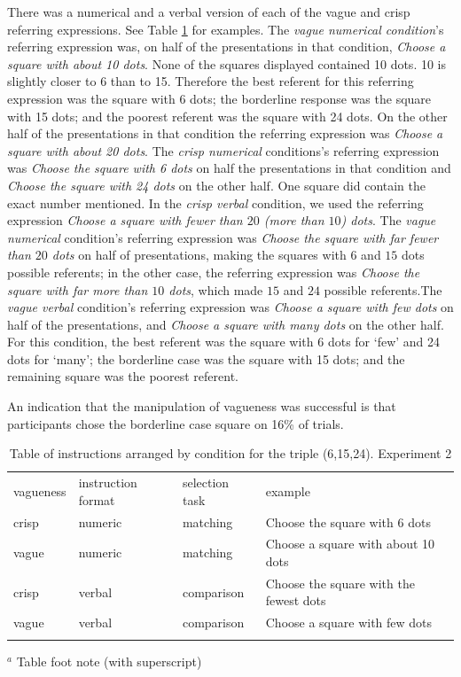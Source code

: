 \documentclass[graybox,envcountchap,sectrefs%
,footinfo
]{svmono}
\begin{document}
There was a numerical and a verbal version of each of the vague and crisp referring expressions. See Table \ref{instructionse2} for examples.
The {\em vague numerical condition}'s referring expression was, on half of the presentations in that condition, \emph{Choose a square with about 10 dots}. None of the squares displayed contained 10 dots. 10 is slightly closer to 6 than to 15. Therefore the best referent for this referring expression was the square with 6 dots;  the borderline response was the square with 15 dots; and the poorest referent was the square with 24 dots. On the other half of the presentations in that condition the referring expression was \emph{Choose a square with about 20 dots}. The {\em crisp numerical} conditions's referring expression was \emph{Choose the square with 6 dots} on half the presentations in that condition and \emph{Choose the square with 24 dots} on the other half. One square did contain the exact number mentioned.  In the {\em crisp verbal} condition, we used the referring expression \emph{Choose a square with fewer than $20$ (more than $10$) dots}.  The {\em vague numerical} condition's referring expression was \emph{Choose the square with far fewer than $20$ dots} on half of presentations, making the squares with 6 and $15$ dots possible referents; in the other case, the referring expression was \emph{Choose the square with far more than $10$ dots}, which made $15$ and $24$ possible referents.The {\em vague verbal} condition's referring expression was \emph{Choose a square with few dots} on half of the presentations, and \emph{Choose a square with many dots} on the other half. For this condition, the best referent was the square with 6 dots for `few' and 24 dots for `many'; the borderline case was the square with 15 dots; and the remaining square was the poorest referent. 

An indication that the manipulation of vagueness was successful is that participants chose the borderline case square on 16\% of trials.

\begin{table}
\caption{Table of instructions arranged by condition for the triple (6,15,24). Experiment 2}
\label{instructionse2} 
\begin{tabular}{llll}
\hline\noalign{\smallskip}
vagueness&instruction format&selection task&example\\
\noalign{\smallskip}\svhline\noalign{\smallskip}
crisp 	& 	numeric	& matching	&	Choose the square with 6 dots \\
vague	&	numeric 	& matching	&	Choose a square with about 10 dots\\
crisp		&	verbal	& comparison	&	Choose the square with the fewest dots\\
vague	&	verbal	& comparison	&	Choose a square with few dots\\
\noalign{\smallskip}\hline\noalign{\smallskip}
\end{tabular}
$^a$ Table foot note (with superscript)\\
\end{table}
\end{document}
